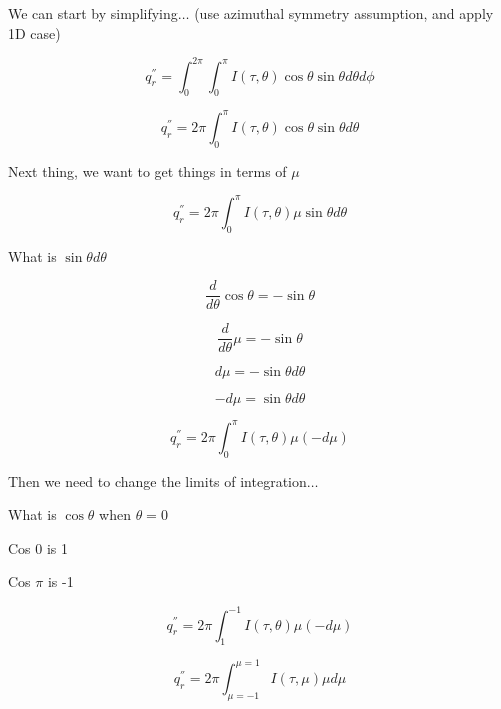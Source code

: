 \documentclass[12pt]{article}
\renewcommand{\_}{\kern-1.5pt\textunderscore\kern-1.5pt}
\begin{document}
We can start by simplifying$ \ldots $  (use azimuthal symmetry assumption, and apply 1D case)\par

 \[ q_{r}^{''}= \int _{0}^{2 \pi } \int _{0}^{ \pi }I \left(  \tau,  \theta  \right) \cos  \theta \sin  \theta  d \theta  d \phi  \] \par

 \[ q_{r}^{''}=2 \pi  \int _{0}^{ \pi }I \left(  \tau,  \theta  \right) \cos  \theta \sin  \theta d \theta  \] \par

Next thing, we want to get things in terms of  \(  \mu  \) \par

 \[ q_{r}^{''}=2 \pi  \int _{0}^{ \pi }I \left(  \tau,  \theta  \right)  \mu \sin  \theta d \theta  \] \par

What is  \( \sin  \theta  d \theta  \) \par

 \[ \frac{d}{d \theta }\cos  \theta =-\sin  \theta  \] \par

 \[ \frac{d}{d \theta } \mu =-\sin  \theta  \] \par

 \[ d \mu =-\sin  \theta  d \theta  \] \par

 \[ -d \mu =\sin  \theta  d \theta  \] \par

 \[ q_{r}^{''}=2 \pi  \int _{0}^{ \pi }I \left(  \tau,  \theta  \right)  \mu   \left( -d \mu  \right)  \] \par

Then we need to change the limits of integration$ \ldots $ \par

What is  \( \cos  \theta  \)  when  \(  \theta =0 \) \par

Cos 0 is 1\par

Cos  \(  \pi  \)  is -1\par

 \[ q_{r}^{''}=2 \pi  \int _{1}^{-1}I \left(  \tau,  \theta  \right)  \mu   \left( -d \mu  \right)  \] \par

 \[ q_{r}^{''}=2 \pi  \int _{ \mu =-1}^{ \mu =1}I \left(  \tau,  \mu  \right)   \mu  d \mu  \] \par
\end{document}
